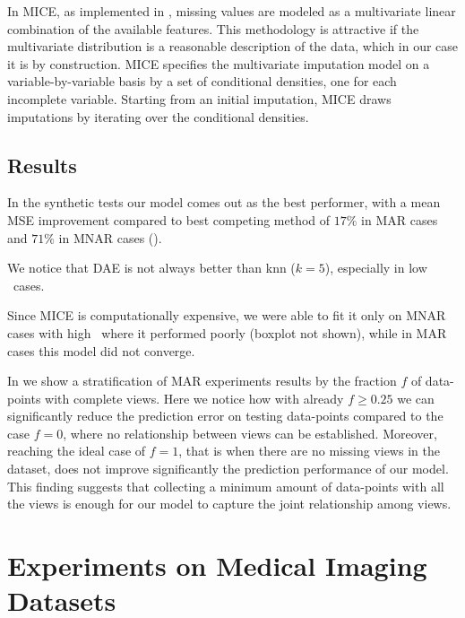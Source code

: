 In MICE, as implemented in \cite{mice}, missing values are modeled as a multivariate linear combination of the available features.
This methodology is attractive if the multivariate distribution is a reasonable description of the data, which in our case it is by construction.
MICE specifies the multivariate imputation model on a variable-by-variable basis by a set of conditional densities, one for each incomplete variable.
Starting from an initial imputation, MICE draws imputations by iterating over the conditional densities.

\subsection{Results}


In the synthetic tests our model comes out as the best performer, with a mean MSE improvement compared to best competing method of $17\%$ in MAR cases and $71\%$ in MNAR cases ().

We notice that DAE is not always better than knn ($k=5$), especially in low \snr\ cases.

Since MICE is computationally expensive, we were able to fit it only on MNAR cases with high \snr\, where it performed poorly (boxplot not shown), while in MAR cases this model did not converge.

In  we show a stratification of MAR experiments results by the fraction $f$ of data-points with complete views.
Here we notice how with already $f \geq 0.25$ we can significantly reduce the prediction error on testing data-points compared to the case $f=0$, where no relationship between views can be established.
Moreover, reaching the ideal case of $f=1$, that is when there are no missing views in the dataset, does not improve significantly the prediction performance of our model.
This finding suggests that collecting a minimum amount of data-points with all the views is enough for our model to capture the joint relationship among views.

\section{Experiments on Medical Imaging Datasets}
\label{ssec:real}


% 
% 





